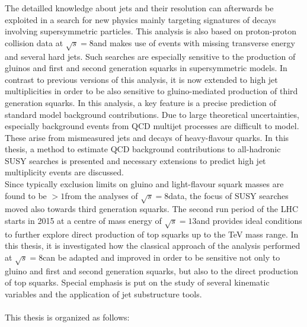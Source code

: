 The detailled knowledge about jets and their resolution can afterwards be exploited in a search for new physics mainly targeting signatures of decays involving supersymmetric particles. This analysis is also based on proton-proton collision data at $\sqrt{s} = 8$\tev and makes use of events with missing transverse energy and several hard jets. Such searches are especially sensitive to the production of gluinos and first and second generation squarks in supersymmetric models. In contrast to previous versions of this analysis, it is now extended to high jet multiplicities in order to be also sensitive to gluino-mediated production of third generation squarks. In this analysis, a key feature is a precise prediction of standard model background contributions. Due to large theoretical uncertainties, especially background events from QCD multijet processes are difficult to model. These arise from mismeasured jets and decays of heavy-flavour quarks. In this thesis, a method to estimate QCD background contributions to all-hadronic SUSY searches is presented and necessary extensions to predict high jet multiplicity events are discussed.  \\
Since typically exclusion limits on gluino and light-flavour squark masses are found to be $> 1$\tev from the analyses of $\sqrt{s} = 8$\tev data, the focus of SUSY searches moved also towards third generation squarks. The second run period of the LHC starts in 2015 at a centre of mass energy of $\sqrt{s} = 13$\tev and provides ideal conditions to further explore direct production of top squarks up to the TeV mass range. In this thesis, it is investigated how the classical approach of the analysis performed at $\sqrt{s} = 8$\tev can be adapted and improved in order to be sensitive not only to gluino and first and second generation squarks, but also to the direct production of top squarks. Special emphasis is put on the study of several kinematic variables and the application of jet substructure tools. \\ 
\\
This thesis is organized as follows:
